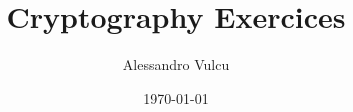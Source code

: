 \documentclass[a4paper,12pt]{article}
\theoremstyle{mythmstyle}
\begin{document}
\title{Cryptography Exercices}
\author{Alessandro Vulcu}
\date{\today}
\maketitle
\newpage
\tableofcontents
\newpage


\newpage

\newpage

\newpage

\newpage

\newpage

\end{document}
